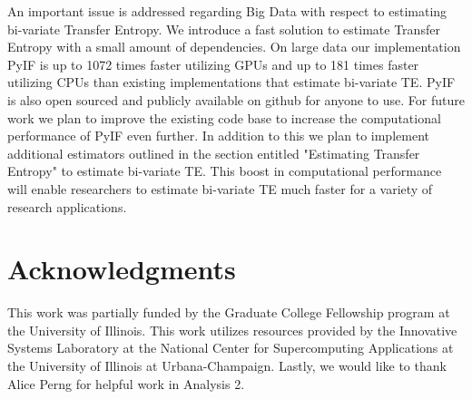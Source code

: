 \documentclass[conference]{IEEEtran}
\begin{document}
An important issue is addressed regarding Big Data with respect to estimating bi-variate Transfer Entropy. We introduce a fast solution to estimate Transfer Entropy with a small amount of dependencies. On large data our implementation PyIF is up to 1072 times faster utilizing GPUs and up to 181 times faster utilizing CPUs than existing implementations that estimate bi-variate TE. PyIF is also open sourced and publicly available on github for anyone to use.  For future work we plan to improve the existing code base to increase the computational performance of PyIF even further. In addition to this we plan to implement additional estimators outlined in the section entitled "Estimating Transfer Entropy" to estimate bi-variate TE. This boost in computational performance will enable researchers to estimate bi-variate TE much faster for a variety of research applications. 

\section*{Acknowledgments}
This work was partially funded by the Graduate College Fellowship program at the University of Illinois. This work utilizes resources provided by the Innovative Systems Laboratory at the National Center for Supercomputing Applications at the University of Illinois at Urbana-Champaign. Lastly, we would like to thank Alice Perng for helpful work in Analysis 2.
\end{document}
